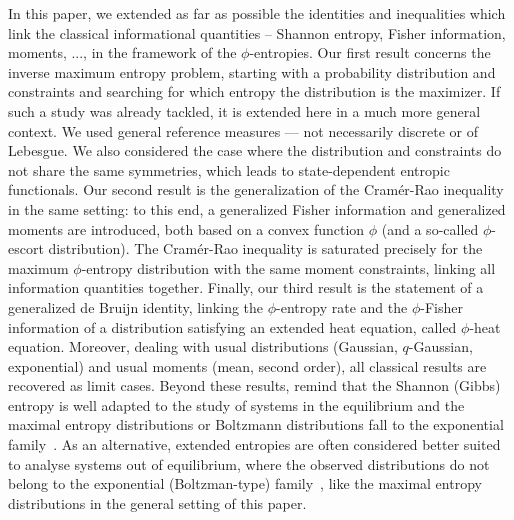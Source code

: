 \documentclass[entropy,article,submit,moreauthors,pdftex]{Definitions/mdpi}
\begin{document}
In this  paper, we extended as  far as possible the  identities and inequalities
which link  the classical  informational quantities  -- Shannon  entropy, Fisher
information, moments, ...,  in the framework of the  $\phi$-entropies. Our first
result concerns the inverse maximum entropy problem, starting with a probability
distribution and constraints and searching for which entropy the distribution is
the maximizer.  If  such a study was  already tackled, it is extended  here in a
much  more  general  context.   We  used  general  reference  measures  ---  not
necessarily discrete  or of  Lebesgue.  We  also considered  the case  where the
distribution and  constraints do not share  the same symmetries, which  leads to
state-dependent entropic  functionals.  Our second result  is the generalization
of the Cram\'er-Rao  inequality in the same setting: to  this end, a generalized
Fisher  information and  generalized moments  are  introduced, both  based on  a
convex  function  $\phi$  (and  a so-called  $\phi$-escort  distribution).   The
Cram\'er-Rao inequality  is saturated  precisely for the  maximum $\phi$-entropy
distribution  with   the  same  moment  constraints,   linking  all  information
quantities  together.   Finally,  our  third   result  is  the  statement  of  a
generalized  de  Bruijn  identity,  linking  the  $\phi$-entropy  rate  and  the
$\phi$-Fisher  information  of  a   distribution  satisfying  an  extended  heat
equation,   called  $\phi$-heat   equation.    Moreover,   dealing  with   usual
distributions  (Gaussian, $q$-Gaussian,  exponential) and  usual moments  (mean,
second order), all classical results are  recovered as limit cases. Beyond these
results, remind that the Shannon (Gibbs) entropy is well adapted to the study of
systems in  the equilibrium and  the maximal entropy distributions  or Boltzmann
distributions fall to the exponential family~\cite{CovTho06, BorLew91:05, Arn01,
  MezMon09}.  As an alternative, extended  entropies are often considered better
suited to analyse  systems out of equilibrium, where  the observed distributions
do not  belong to the exponential  (Boltzman-type) family~\cite{Tsa88, TsaMen98,
  Tsa99, Tsa09, EssSch00,  ParBir05}, like the maximal  entropy distributions in
the general setting of this paper.
\end{document}
